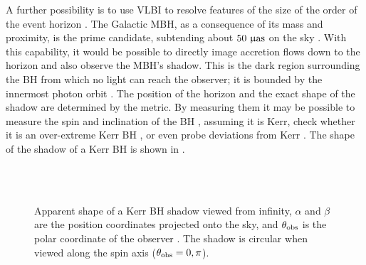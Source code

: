 A further possibility is to use VLBI to resolve features of the size of the order of the event horizon \citep{Doeleman2008,Fish2010}. The Galactic MBH, as a consequence of its mass and proximity, is the prime candidate, subtending about $50~\mathrm{\upmu as}$ on the sky \citep{Broderick2009a,Johannsen2012a}. With this capability, it would be possible to directly image accretion flows down to the horizon and also observe the MBH's shadow. This is the dark region surrounding the BH from which no light can reach the observer; it is bounded by the innermost photon orbit \citep[section 63]{Chandrasekhar1992}. The position of the horizon and the exact shape of the shadow are determined by the metric. By measuring them it may be possible to measure the spin and inclination of the BH \citep{Hioki2009a}, assuming it is Kerr, check whether it is an over-extreme Kerr BH \citep{Bambi2009}, or even probe deviations from Kerr \citep{Johannsen2010a, Johannsen2010b}.%
The shape of the shadow of a Kerr BH is shown in .
\begin{figure}
\vspace{0.5\baselineskip}
  \centering
    \quad
    \quad
    \\
    \quad
    \quad
    \\
    \quad  
    \caption{Apparent shape of a Kerr BH shadow viewed from infinity, $\alpha$ and $\beta$ are the position coordinates projected onto the sky, and $\theta_\mathrm{obs}$ is the polar coordinate of the observer \citep[section 63]{Chandrasekhar1992}. The shadow is circular when viewed along the spin axis ($\theta_\mathrm{obs} = 0, \pi$).} 
    \label{fig:Shadow}
\end{figure}
